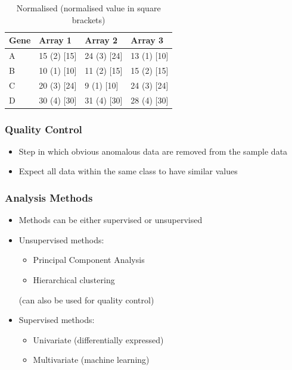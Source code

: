 \documentclass[a4paper]{article}
\begin{document}
\begin{table}[h!]
  \centering
  \begin{tabular}{@{}llll@{}}
    \toprule
    Gene & Array 1     & Array 2     & Array 3     \\
    \midrule
    A    & 15 (2) [15] & 24 (3) [24] & 13 (1) [10] \\
    B    & 10 (1) [10] & 11 (2) [15] & 15 (2) [15] \\
    C    & 20 (3) [24] & 9 (1) [10]  & 24 (3) [24] \\
    D    & 30 (4) [30] & 31 (4) [30] & 28 (4) [30] \\
    \bottomrule
  \end{tabular}
  \caption{Normalised (normalised value in square brackets)}
  \label{tab:qn_raw}
\end{table}

\subsubsection{Quality Control}

\begin{itemize}
  \item
    Step in which obvious anomalous data are removed from the sample data

  \item
    Expect all data within the same class to have similar values
\end{itemize}

\subsubsection{Analysis Methods}

\begin{itemize}
  \item
    Methods can be either supervised or unsupervised

  \item
    Unsupervised methods:

    \begin{itemize}
      \item Principal Component Analysis
      \item Hierarchical clustering
    \end{itemize}

    (can also be used for quality control)

  \item
    Supervised methods:

    \begin{itemize}
      \item Univariate (differentially expressed)
      \item Multivariate (machine learning)
    \end{itemize}
\end{itemize}
\end{document}
